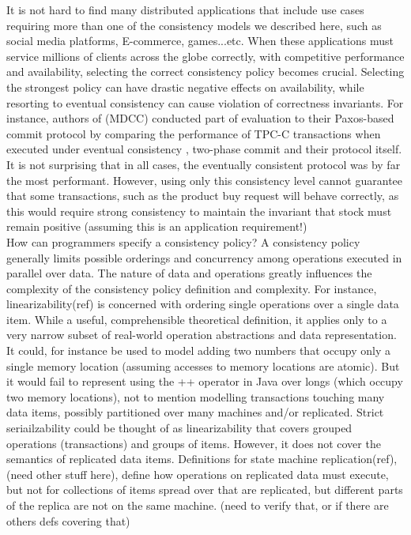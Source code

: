It is not hard to find many distributed applications that include use cases
requiring more than one of the consistency models we described here, such as social media
platforms, E-commerce, games...etc. When these applications must service millions of
clients across the globe correctly, with competitive performance and
availability, selecting the correct consistency policy becomes crucial.
Selecting the strongest policy can have drastic negative effects on availability, while
resorting to eventual consistency can cause violation of correctness invariants.
For instance, authors of (MDCC) conducted part of evaluation to their Paxos-based commit
protocol by comparing the performance of TPC-C transactions when executed under eventual consistency  
, two-phase commit  and their protocol itself. It is not surprising that in all cases, the eventually
consistent protocol was by far the most
performant. However, using only this consistency level cannot guarantee that
some transactions, such as the product buy request will behave correctly, as
this would require strong consistency to maintain the invariant that stock must
remain positive (assuming this is an application requirement!) \\

How can programmers specify a consistency policy? 
A consistency policy generally limits possible orderings and concurrency among
operations executed in parallel over data. The nature of data and operations
greatly influences the complexity of the consistency policy definition and
complexity. For instance, linearizability(ref) is concerned with ordering single
operations over a single data item. While a useful, comprehensible theoretical
definition, it applies only to a very narrow subset of real-world operation
abstractions and data representation. It could, for instance be used to model adding
two numbers that occupy only a single memory location (assuming accesses to
memory locations are atomic). But it would fail to represent using the ++
operator in Java over longs (which occupy two memory locations), not to mention
modelling transactions touching many data items, possibly partitioned over many
machines and/or replicated. Strict seriailzability could be thought of as
linearizability that covers grouped operations (transactions) and groups of
items. However, it does not cover the semantics of replicated data items.
Definitions for state machine replication(ref), (need other stuff here), define
how operations on replicated data must execute, but not for collections of items
spread over that are replicated, but different parts of the replica are not on
the same machine. (need to verify that, or if there are others defs covering that)

